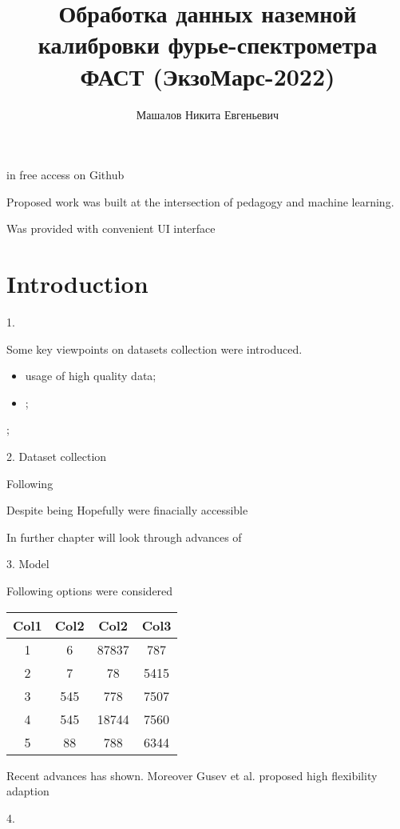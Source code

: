 \documentclass{mipt-thesis-bs}
\title{Обработка данных наземной калибровки фурье-спектрометра ФАСТ (ЭкзоМарс-2022)}
\author{Машалов Никита Евгеньевич}
\begin{document}
in free access on Github


Proposed work was built at the intersection of pedagogy and machine learning. 

Was provided with convenient UI interface 

\chapter{Introduction}

1. 

Some key viewpoints on datasets collection were introduced.

\begin{itemize}
    \item usage of high quality data;
    \item ;
\end{itemize};

2. Dataset collection


Following 

Despite being Hopefully were finacially accessible 

In further chapter will look through advances of 


3. Model 

Following options were considered


\begin{center}
\begin{tabular}{||c c c c||} 
     \hline
     Col1 & Col2 & Col2 & Col3 \\ [0.5ex] 
     \hline\hline
     1 & 6 & 87837 & 787 \\ 
     \hline
     2 & 7 & 78 & 5415 \\
     \hline
     3 & 545 & 778 & 7507 \\
     \hline
     4 & 545 & 18744 & 7560 \\
     \hline
     5 & 88 & 788 & 6344 \\ [1ex] 
     \hline
\end{tabular}
\end{center}

Recent advances has shown. Moreover Gusev et al. proposed high 
flexibility adaption


4. 
\end{document}
